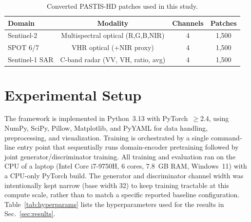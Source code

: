 \documentclass[runningheads]{llncs}
\begin{document}
\begin{table}[t]
\centering
\caption{Converted PASTIS-HD patches used in this study.}
\label{tab:dataset}
\begin{tabular}{@{}lccc@{}}
\toprule
\textbf{Domain} & \textbf{Modality} & \textbf{Channels} & \textbf{Patches} \\
\midrule
Sentinel-2       & Multispectral optical (R,G,B,NIR) & 4 & 1{,}500 \\
SPOT 6/7         & VHR optical (+NIR proxy)          & 4 & 1{,}500 \\
Sentinel-1 SAR   & C-band radar (VV, VH, ratio, avg) & 4 & 1{,}500 \\
\bottomrule
\end{tabular}
\end{table}

\section{Experimental Setup}
\label{sec:setup}
The framework is implemented in Python~3.13 with PyTorch~$\geq$2.4, using NumPy, SciPy, Pillow, Matplotlib, and PyYAML for data handling, preprocessing, and visualization. Training is orchestrated by a single command-line entry point that sequentially runs domain-encoder pretraining followed by joint generator/discriminator training. All training and evaluation ran on the CPU of a laptop (Intel Core i7-9750H, 6 cores, 7.8~GB RAM, Windows~11) with a CPU-only PyTorch build. The generator and discriminator channel width was intentionally kept narrow (base width 32) to keep training tractable at this compute scale, rather than to match a specific reported baseline configuration. Table~\ref{tab:hyperparams} lists the hyperparameters used for the results in Sec.~\ref{sec:results}.
\end{document}
